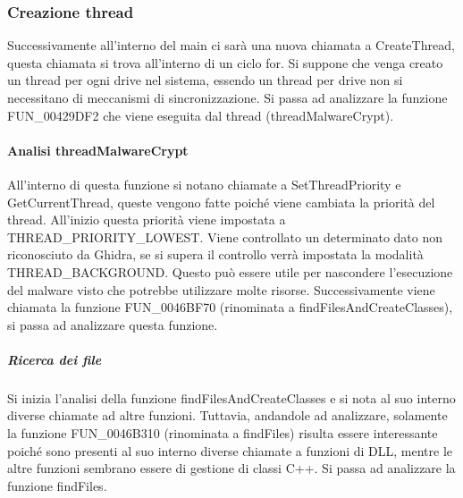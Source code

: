 \documentclass[a4paper,12pt]{article}
\begin{document}
\subsubsection{Creazione thread }
Successivamente all'interno del main ci sarà una nuova chiamata a CreateThread, questa chiamata si trova all'interno di un ciclo for. Si suppone che venga creato un thread per ogni drive nel sistema, essendo un thread per drive non si necessitano di meccanismi di sincronizzazione. Si passa ad analizzare la funzione FUN\_00429DF2 che viene eseguita dal thread (threadMalwareCrypt). 

\paragraph{Analisi threadMalwareCrypt}
All'interno di questa funzione si notano chiamate a SetThreadPriority e GetCurrentThread, queste vengono fatte poiché viene cambiata la priorità del thread. All'inizio questa priorità viene impostata a THREAD\_PRIORITY\_LOWEST. Viene controllato un determinato dato non riconosciuto da Ghidra, se si supera il controllo verrà impostata la modalità THREAD\_BACKGROUND. Questo può essere utile per nascondere l'esecuzione del malware visto che potrebbe utilizzare molte risorse. Successivamente viene chiamata la funzione FUN\_0046BF70 (rinominata a findFilesAndCreateClasses), si passa ad analizzare questa funzione.

\subparagraph{Ricerca dei file}
Si inizia l'analisi della funzione findFilesAndCreateClasses e si nota al suo interno diverse chiamate ad altre funzioni. Tuttavia, andandole ad analizzare, solamente la funzione FUN\_0046B310 (rinominata a findFiles) risulta essere interessante poiché sono presenti al suo interno diverse chiamate a funzioni di DLL, mentre le altre funzioni sembrano essere di gestione di classi C++. Si passa ad analizzare la funzione findFiles.
\end{document}
